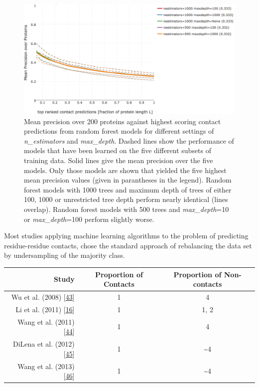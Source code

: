 \documentclass[12pt,a4paper,twoside]{book}
\theoremstyle{definition}
\theoremstyle{definition}
\theoremstyle{remark}
\begin{document}
\begin{figure}

{\centering \includegraphics[width=1\linewidth]{img/random_forest_contact_prior/new_gridsearch/precision_vs_rank_cv_on_test_random_forest_nestimators_maxdepth_top5_notitle} 

}

\caption{Mean precision over
200 proteins against highest scoring contact predictions from random
forest models for different settings of \emph{n\_estimators} and
\emph{max\_depth}. Dashed lines show the performance of models that have
been learned on the five different subsets of training data. Solid lines
give the mean precision over the five models. Only those models are
shown that yielded the five highest mean precision values (given in
parantheses in the legend). Random forest models with 1000 trees and
maximum depth of trees of either 100, 1000 or unrestricted tree depth
perform nearly identical (lines overlap). Random forest models with 500
trees and \emph{max\_depth}=10 or \emph{max\_depth}=100 perform slightly
worse.}\label{fig:rf-gridsearch-nestimators-maxfeatures}
\end{figure}

Most studies applying machine learning algorithms to the problem of
predicting residue-residue contacts, chose the standard approach of
rebalancing the data set by undersampling of the majority class.

\begin{longtable}[]{@{}rcc@{}}
\toprule
Study & Proportion of Contacts & Proportion of
Non-contacts\tabularnewline
\midrule
\endhead
Wu et al. (2008) {[}\protect\hyperlink{ref-Wu2008}{43}{]} & 1 &
4\tabularnewline
Li et al. (2011) {[}\protect\hyperlink{ref-Li2011}{16}{]} & 1 & 1,
2\tabularnewline
Wang et al. (2011) {[}\protect\hyperlink{ref-Wang2011}{44}{]} & 1 &
4\tabularnewline
DiLena et al. (2012) {[}\protect\hyperlink{ref-DiLena2012a}{45}{]} & 1 &
\textasciitilde{}4\tabularnewline
Wang et al. (2013) {[}\protect\hyperlink{ref-Wang2013}{46}{]} & 1 &
\textasciitilde{}4\tabularnewline
\bottomrule
\end{longtable}
\end{document}
